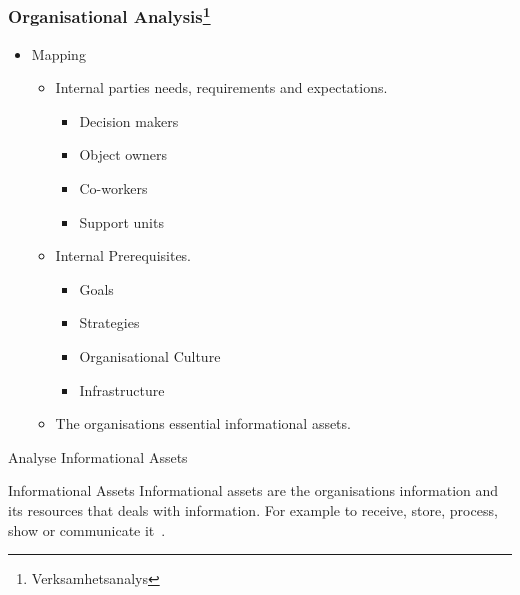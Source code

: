 \documentclass{beamer}
\begin{document}
\subsubsection{Organisational Analysis\footnote{Verksamhetsanalys}}
\begin{frame}{\insertsubsubsectionhead}
  \begin{itemize}
    \item Mapping
    \begin{itemize}
      \item Internal parties needs, requirements and expectations.
      \begin{itemize}
        \item Decision makers
        \item Object owners
        \item Co-workers
        \item Support units
      \end{itemize}
      \item Internal Prerequisites.
      \begin{itemize}
        \item Goals
        \item Strategies
        \item Organisational Culture
        \item Infrastructure
      \end{itemize}
      \item The organisations essential informational assets.
    \end{itemize}
  \end{itemize}
\end{frame}

\begin{frame}{Analyse Informational Assets}{\insertsubsubsectionhead}
  \begin{block}{Informational Assets}
    Informational assets are the organisations information and its resources
    that deals with information. For example to receive, store, process, show or
    communicate it~\cite{msb_metodstod}.
  \end{block}
\end{frame}
\end{document}
